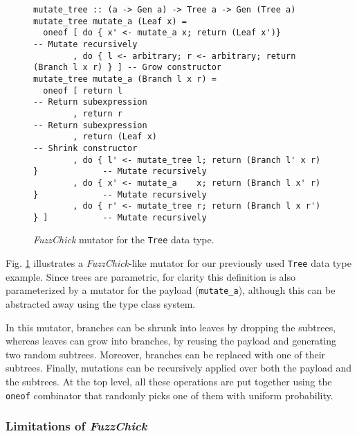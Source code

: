 \documentclass[sigconf, anonymous]{acmart}
\newcommand{\fuzzchick}{\textit{FuzzChick}\xspace}
\begin{document}
\begin{figure}
\vspace{-5pt}
\begin{verbatim}
mutate_tree :: (a -> Gen a) -> Tree a -> Gen (Tree a)
mutate_tree mutate_a (Leaf x) =
  oneof [ do { x' <- mutate_a x; return (Leaf x')}                       -- Mutate recursively
        , do { l <- arbitrary; r <- arbitrary; return (Branch l x r) } ] -- Grow constructor
mutate_tree mutate_a (Branch l x r) =
  oneof [ return l                                                       -- Return subexpression
        , return r                                                       -- Return subexpression
        , return (Leaf x)                                                -- Shrink constructor
        , do { l' <- mutate_tree l; return (Branch l' x r) }             -- Mutate recursively
        , do { x' <- mutate_a    x; return (Branch l x' r) }             -- Mutate recursively
        , do { r' <- mutate_tree r; return (Branch l x r') } ]           -- Mutate recursively
\end{verbatim}
\caption{\label{fig:fuzzchick:mutator}\fuzzchick mutator for the \texttt{Tree} data type. }
\end{figure}

Fig. \ref{fig:fuzzchick:mutator} illustrates a \fuzzchick-like mutator for our
previously used \texttt{Tree} data type example.
%
Since trees are parametric, for clarity this definition is also parameterized by
a mutator for the payload (\texttt{mutate\_a}), although this can be abstracted
away using the type class system.



In this mutator, branches can be shrunk into leaves by dropping the subtrees,
whereas leaves can grow into branches, by reusing the payload and generating two
random subtrees.
%
Moreover, branches can be replaced with one of their subtrees.
%
Finally, mutations can be recursively applied over both the payload and the
subtrees.
%
At the top level, all these operations are put together using the \texttt{oneof}
combinator that randomly picks one of them with uniform probability.

%
%
\subsubsection{Limitations of \fuzzchick}
\end{document}
